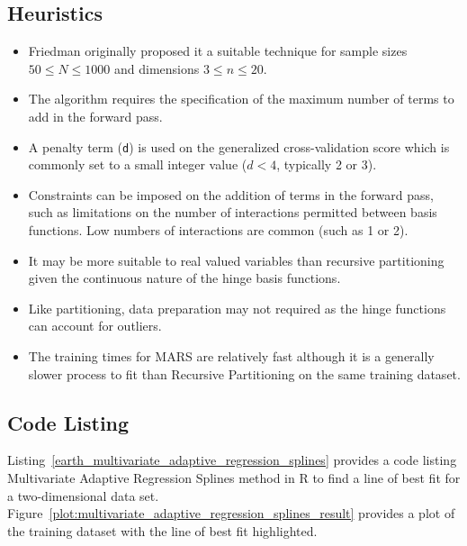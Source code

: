\subsection{Heuristics}

\begin{itemize}
	\item Friedman originally proposed it a suitable technique for sample sizes $50 \leq N \leq 1000$ and dimensions $3 \leq n \leq 20$.
	\item The algorithm requires the specification of the maximum number of terms to add in the forward pass. %
	\item A penalty term (\texttt{d}) is used on the generalized cross-validation score which is commonly set to a small integer value ($d<4$, typically 2 or 3).
	\item Constraints can be imposed on the addition of terms in the forward pass, such as limitations on the number of interactions permitted between basis functions. Low numbers of interactions are common (such as 1 or 2).
	\item It may be more suitable to real valued variables than recursive partitioning given the continuous nature of the hinge basis functions.
	\item Like partitioning, data preparation may not required as the hinge functions can account for outliers.
	\item The training times for MARS are relatively fast although it is a generally slower process to fit than Recursive Partitioning on the same training dataset.
\end{itemize}

\subsection{Code Listing}
Listing~\ref{earth_multivariate_adaptive_regression_splines} provides a code listing Multivariate Adaptive Regression Splines method in R to find a line of best fit for a two-dimensional data set.
Figure~\ref{plot:multivariate_adaptive_regression_splines_result} provides a plot of the training dataset with the line of best fit highlighted.

